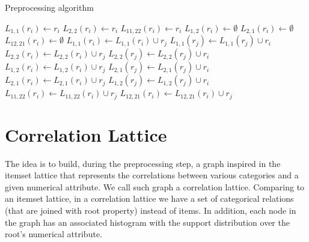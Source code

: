 \begin{algorithm}[h!]
  \caption{Preprocessing algorithm}
  \label{alg3}

     {
      $L_{1,1}(r_i) \leftarrow r_i$\;
      $L_{2,2}(r_i) \leftarrow r_i$\;
      $L_{11,22}(r_i) \leftarrow r_i$\;
      $L_{1,2}(r_i) \leftarrow \emptyset$\;
      $L_{2,1}(r_i) \leftarrow \emptyset$\;
      $L_{12,21}(r_i) \leftarrow \emptyset$\;
    }
     {
	 {
	     {
		$L_{1,1}(r_i) \leftarrow L_{1,1}(r_i) \cup r_j$\;
		$L_{1,1}(r_j) \leftarrow L_{1,1}(r_j) \cup r_i$\;
	    }
	     {
		$L_{2,2}(r_i) \leftarrow L_{2,2}(r_i) \cup r_j$\;
		$L_{2,2}(r_j) \leftarrow L_{2,2}(r_j) \cup r_i$\;
	    }
	     {
		$L_{1,2}(r_i) \leftarrow L_{1,2}(r_i) \cup r_j$\;
		$L_{2,1}(r_j) \leftarrow L_{2,1}(r_j) \cup r_i$\;
	    }
	     {
		$L_{2,1}(r_i) \leftarrow L_{2,1}(r_i) \cup r_j$\;
		$L_{1,2}(r_j) \leftarrow L_{1,2}(r_j) \cup r_i$\;
	    }
	}
   }
    {
	 {
	     {
		$L_{11,22}(r_i) \leftarrow L_{11,22}(r_i) \cup r_j$\;
	    }
	}
	 {
	     {
		$L_{12,21}(r_i) \leftarrow L_{12,21}(r_i) \cup r_j$\;
	    }
	}
   }
\end{algorithm}

\subsection{}

\section{Correlation Lattice}
\label{sec:correlation-lattice}

The idea is to build, during the preprocessing step, a graph inspired in the itemset lattice that represents the
correlations between various categories and a given numerical attribute. We call such graph a
correlation lattice.
Comparing to an itemset lattice, in a correlation lattice we have a set of categorical relations (that are joined with
root property) instead of items. In addition, each node in the graph has an associated histogram with the support
distribution over the root's numerical attribute.

